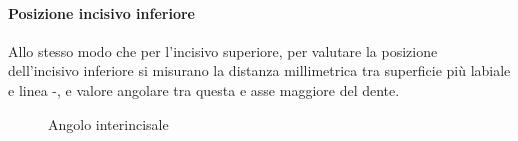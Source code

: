 \paragraph{Posizione incisivo inferiore}
Allo stesso modo che per l'incisivo superiore, per valutare la posizione dell'incisivo inferiore si misurano la distanza millimetrica tra superficie più labiale e linea -, e valore angolare tra questa e asse maggiore del dente.

\begin{figure}[p!]
\centering
\begin{minipage}{.44\textwidth}
 \centering
 \caption{Angolo interincisale }
 \label{fig:steiner_interincisale}
\end{minipage}\quad\quad
\begin{minipage}{.44\textwidth}
 \centering

\end{minipage}
\end{figure}
